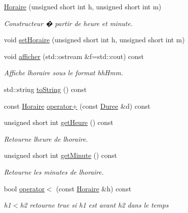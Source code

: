 \begin{DoxyCompactItemize}
\item 
\hyperlink{class_t_i_m_e_1_1_horaire_ab833c9dc3a4fdbda3894dbbd72643813}{Horaire} (unsigned short int h, unsigned short int m)
\begin{DoxyCompactList}\small\item\em Constructeur � partir de heure et minute. \end{DoxyCompactList}\item 
void \hyperlink{class_t_i_m_e_1_1_horaire_ae4dd22490e383b0662fc5788bd42d370}{set\+Horaire} (unsigned short int h, unsigned short int m)
\item 
void \hyperlink{class_t_i_m_e_1_1_horaire_af4f27b26ed338d7fa03659107f813cf8}{afficher} (std\+::ostream \&f=std\+::cout) const 
\begin{DoxyCompactList}\small\item\em Affiche l\textquotesingle{}horaire sous le format hh\+Hmm. \end{DoxyCompactList}\item 
std\+::string \hyperlink{class_t_i_m_e_1_1_horaire_a1f10334de3eb01de8e64f873aafbbf6b}{to\+String} () const 
\item 
const \hyperlink{class_t_i_m_e_1_1_horaire}{Horaire} \hyperlink{class_t_i_m_e_1_1_horaire_a2a3a633702c9bf3ab9ab67033d632a43}{operator+} (const \hyperlink{class_t_i_m_e_1_1_duree}{Duree} \&d) const 
\item 
unsigned short int \hyperlink{class_t_i_m_e_1_1_horaire_ace5d2381e38d80e99c6a84158a4044e3}{get\+Heure} () const 
\begin{DoxyCompactList}\small\item\em Retourne l\textquotesingle{}heure de l\textquotesingle{}horaire. \end{DoxyCompactList}\item 
unsigned short int \hyperlink{class_t_i_m_e_1_1_horaire_a5b0e73a520913fd0588407c1507344a8}{get\+Minute} () const 
\begin{DoxyCompactList}\small\item\em Retourne les minutes de l\textquotesingle{}horaire. \end{DoxyCompactList}\item 
bool \hyperlink{class_t_i_m_e_1_1_horaire_a30ec21c5b5cad95c1c17c02c66d796a6}{operator$<$} (const \hyperlink{class_t_i_m_e_1_1_horaire}{Horaire} \&h) const 
\begin{DoxyCompactList}\small\item\em h1$<$h2 retourne true si h1 est avant h2 dans le temps \end{DoxyCompactList}\end{DoxyCompactItemize}


